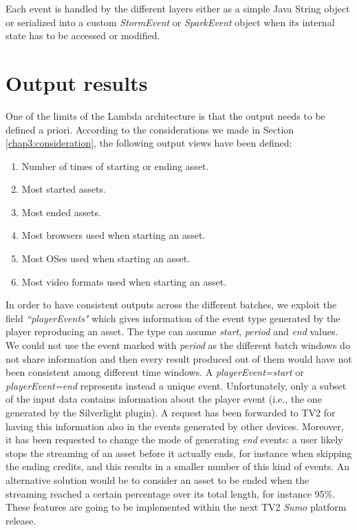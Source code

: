 Each event is handled by the different layers either as a simple Java String object or serialized into a custom \textit{StormEvent} or \textit{SparkEvent} object when its internal state has to be accessed or modified.

\section{Output results}
One of the limits of the Lambda architecture is that the output needs to be defined a priori. According to the considerations we made in Section \ref{chap3:consideration}, the following output views have been defined:
\begin{enumerate}
\item Number of times of starting or ending asset. 
\item Most started assets.
\item Most ended assets.
\item Most browsers used when starting an asset.
\item Most OSes used when starting an asset.
\item Most video formats used when starting an asset.
\end{enumerate}
In order to have consistent outputs across the different batches, we exploit the field \textit{``playerEvents"} which gives information of the event type generated by the player reproducing an asset. The type can assume \textit{start}, \textit{period} and \textit{end} values. We could not use the event marked with \textit{period} as the different batch windows do not share information and then every result produced out of them would have not been consistent among different time windows. A \textit{playerEvent=start} or \textit{playerEvent=end} represents instead a unique event. Unfortunately, only a subset of the input data contains information about the player event (i.e., the one generated by the Silverlight plugin). A request has been forwarded to TV2 for having this information also in the events generated by other devices. Moreover, it has been requested to change the mode of generating \textit{end} events: a user likely stops the streaming of an asset before it actually ends, for instance when skipping the ending credits, and this results in a smaller number of this kind of events. An alternative solution would be to consider an asset to be ended when the streaming reached a certain percentage over its total length, for instance 95\%. These features are going to be implemented within the next TV2 \textit {Sumo} platform release.

